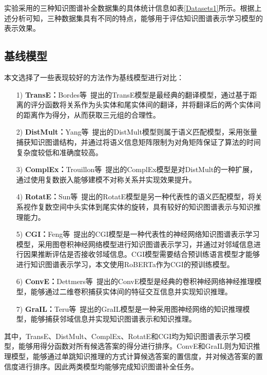 \documentclass[algorithmlist, AutoFakeBold, AutoFakeSlant, figurelist, tablelist, nomlist, engineering, openany]{seuthesix} %
\begin{document}
实验采用的三种知识图谱补全数据集的具体统计信息如表\ref{Datasets1}所示。根据上述分析可知，三种数据集具有不同的特点，能够用于评估知识图谱表示学习模型的表示效果。

\subsection{基线模型}
本文选择了一些表现较好的方法作为基线模型进行对比：
\begin{itemize}
  \item [1)]\textbf{TransE：}Bordes等~\cite{bordes2013translating}提出的TransE模型是最经典的翻译模型，通过基于距离的评分函数将关系作为头实体和尾实体间的翻译，并将翻译后的两个实体间的距离作为得分，从而获取三元组的合理性。
  \item [2)]\textbf{DistMult：}Yang等~\cite{yang2015embedding}提出的DistMult模型则属于语义匹配模型，采用张量捕获知识图谱结构，并通过将语义信息矩阵限制为对角矩阵保证了算法的时间复杂度较低和准确度较高。
  \item [3)]\textbf{ComplEx：}Trouillon等~\cite{trouillon2016complex}提出的ComplEx模型是对DistMult的一种扩展，通过使用复数嵌入能够建模不对称关系并实现效果提升。
  \item [4)]\textbf{RotatE：}Sun等~\cite{sun2018rotate}提出的RotatE模型是另一种代表性的语义匹配模型，将关系视作复数空间中头实体到尾实体的旋转，具有较好的知识图谱表示与知识推理能力。
  \item [5)]\textbf{CGI：}Feng等~\cite{feng2021should}提出的CGI模型是一种代表性的神经网络知识图谱表示学习模型，采用图卷积神经网络模型进行知识图谱表示学习，并通过对邻域信息进行因果推断评估是否接收邻域信息。CGI模型需要结合预训练语言模型才能够进行知识图谱表示学习，本文使用RoBERTa作为CGI的预训练模型。
  \item [6)]\textbf{ConvE：}Dettmers等~\cite{dettmers2018convolutional}提出的ConvE模型是经典的卷积神经网络神经推理模型，能够通过二维卷积捕获实体间的特征交互信息并实现知识推理。
  \item [7)]\textbf{GraIL：}Teru等~\cite{teru2020inductive}提出的GraIL模型是一种采用图神经网络的知识推理模型，能够捕获邻域信息并实现知识图谱表示和知识推理。
\end{itemize}

其中，TransE、DistMult、ComplEx、RotatE和CGI均为知识图谱表示学习模型，能够用得分函数对所有候选答案的得分进行排序。ConvE和GraIL则为知识推理模型，能够通过单跳知识推理的方式计算候选答案的置信度，并对候选答案的置信度进行排序。因此两类模型均能够完成知识图谱补全任务。
\end{document}
